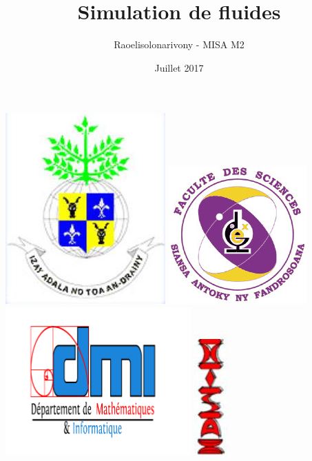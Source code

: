 \documentclass{book}
\title{Simulation de fluides}
\author{Raoelisolonarivony - MISA M2}
\date{Juillet 2017}
\begin{document}
\maketitle

\begin{center}
  \includegraphics[scale=0.25]{001_logo_univ_tana}
  \includegraphics[scale=0.25]{002_logo_fac_sciences}
  \includegraphics[scale=0.25]{003_logo_dmi}
  \includegraphics[scale=0.25]{004_logo_misa}

\end{center}
\end{document}
